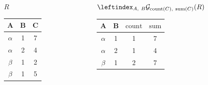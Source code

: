 \documentclass[11pt]{beamer}
\begin{document}
  \begin{frame}
    \begin{columns}[T]
      \begin{column}{0.4\textwidth}
        \centering $R$
        \bigskip \\
        \begin{tabular}{|c|c|c|}
          \hline
          \textbf{A} & \textbf{B} & \textbf{C} \\[0.5ex] \hline\hline
          $\alpha$ & 1 & 7\\ \hline
          $\alpha$ & 2 & 4\\ \hline
          $\beta$ & 1 & 2\\ \hline
          $\beta$ & 1 & 5\\ \hline
        \end{tabular}
      \end{column}
      \begin{column}{0.6\textwidth}
        \centering $\leftindex_{A,\ B}{\mathcal{G}}_{\mathrm{count}(C),\ \mathrm{sum}(C)} (R)$
        \medskip \\
        \begin{tabular}{|c|c|c|c|}
          \hline
          \textbf{A} & \textbf{B} & $\mathrm{count}$ & $\mathrm{sum}$ \\[0.5ex] \hline\hline
          $\alpha$ & 1 & 1 & 7\\ \hline
          $\alpha$ & 2 & 1 & 4\\ \hline
          $\beta$ & 1 & 2 & 7\\ \hline
        \end{tabular}
      \end{column}
    \end{columns}
  \end{frame}
\end{document}
